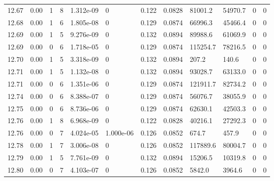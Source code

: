 \documentclass[preview]{standalone}
\begin{document}
{{{{{{{{{{{{{{{\begin{tabular}{L{1.2cm}C{1.2cm} C{0.3cm}C{0.5cm} C{1.4cm}C{1.4cm} C{1.4cm}C{1.4cm} C{1.6cm}C{1.6cm} C{1.6cm}C{1.6cm}}
  12.67  &  0.00  & 1     &  8 &  1.312e-09  & 0  &  0.122&   0.0828& 81001.2 & 54970.7   &  0 & 0  \\ 
  12.68  &  0.00  & 1     &  6 &  1.805e-08  & 0  &  0.129&   0.0874& 66996.3 & 45466.4   &  0 & 0  \\ 
  12.69  &  0.00  & 1     &  5 &  9.276e-09  & 0  &  0.132&   0.0894& 89988.6 & 61069.9   &  0 & 0  \\ 
  12.69  &  0.00  & 0     &  6 &  1.718e-05  & 0  &  0.129&   0.0874& 115254.7 & 78216.5   &  0 & 0  \\ 
  12.70  &  0.00  & 1     &  5 &  3.318e-09  & 0  &  0.132&   0.0894& 207.2 & 140.6   &  0 & 0  \\ 
  12.71  &  0.00  & 1     &  5 &  1.132e-08  & 0  &  0.132&   0.0894& 93028.7 & 63133.0   &  0 & 0  \\ 
  12.71  &  0.00  & 0     &  6 &  1.351e-06  & 0  &  0.129&   0.0874& 121911.7 & 82734.2   &  0 & 0  \\ 
  12.74  &  0.00  & 0     &  6 &  8.388e-07  & 0  &  0.129&   0.0874& 56076.7 & 38055.9   &  0 & 0  \\ 
  12.75  &  0.00  & 0     &  6 &  8.736e-06  & 0  &  0.129&   0.0874& 62630.1 & 42503.3   &  0 & 0  \\ 
  12.76  &  0.00  & 1     &  8 &  6.968e-09  & 0  &  0.122&   0.0828& 40216.1 & 27292.3   &  0 & 0  \\ 
  12.76  &  0.00  & 0     &  7 &  4.024e-05  & 1.000e-06  &  0.126&   0.0852& 674.7 & 457.9   &  0 & 0  \\ 
  12.78  &  0.00  & 1     &  7 &  3.006e-08  & 0  &  0.126&   0.0852& 117889.6 & 80004.7   &  0 & 0  \\ 
  12.79  &  0.00  & 1     &  5 &  7.761e-09  & 0  &  0.132&   0.0894& 15206.5 & 10319.8   &  0 & 0  \\ 
  12.80  &  0.00  & 0     &  7 &  4.103e-07  & 0  &  0.126&   0.0852& 5842.0 & 3964.6   &  0 & 0  \\ 
\hline 
\end{tabular} 

}}}}}}}}}}}}}}}
\end{document}
